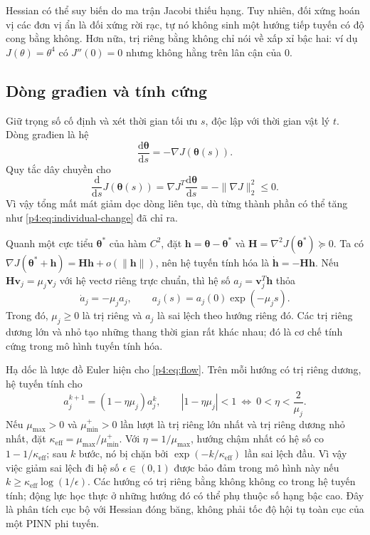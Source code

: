 Hessian có thể suy biến do ma trận Jacobi thiếu hạng. Tuy nhiên,
đối xứng hoán vị các đơn vị ẩn là đối xứng rời rạc, tự nó không sinh
một hướng tiếp tuyến có độ cong bằng không. Hơn nữa, trị riêng bằng
không chỉ nói về xấp xỉ bậc hai: ví dụ $J(\theta)=\theta^4$ có
$J''(0)=0$ nhưng không hằng trên lân cận của $0$.

\subsection{Dòng građien và tính cứng}

Giữ trọng số cố định và xét thời gian tối ưu $s$, độc lập với thời
gian vật lý $t$. Dòng građien là hệ
\begin{equation}
 \frac{\mathrm{d}\boldsymbol{\theta}}{\mathrm{d}s}
 =-\nabla J(\boldsymbol{\theta}(s)).
 \label{p4:eq:flow}
\end{equation}
Quy tắc dây chuyền cho
\begin{equation}
 \frac{\mathrm{d}}{\mathrm{d}s}J(\boldsymbol{\theta}(s))
 =\nabla J^T\frac{\mathrm{d}\boldsymbol{\theta}}{\mathrm{d}s}
 =-\|\nabla J\|_2^2\leq0.
 \label{p4:eq:flow-energy}
\end{equation}
Vì vậy tổng mất mát giảm dọc dòng liên tục, dù từng thành phần có thể
tăng như \eqref{p4:eq:individual-change} đã chỉ ra.

Quanh một cực tiểu $\boldsymbol{\theta}^{*}$ của hàm $C^2$, đặt
$\mathbf{h}=\boldsymbol{\theta}-\boldsymbol{\theta}^{*}$ và
$\mathbf{H}=\nabla^2J(\boldsymbol{\theta}^{*})\succeq0$.
Ta có $\nabla J(\boldsymbol{\theta}^{*}+\mathbf{h})
=\mathbf{H}\mathbf{h}+o(\|\mathbf{h}\|)$, nên hệ tuyến tính hóa là
$\dot{\mathbf{h}}=-\mathbf{H}\mathbf{h}$.
Nếu $\mathbf{H}\mathbf{v}_j=\mu_j\mathbf{v}_j$ với hệ vectơ riêng
trực chuẩn, thì hệ số $a_j=\mathbf{v}_j^T\mathbf{h}$ thỏa
\begin{equation}
 \dot a_j=-\mu_ja_j,
 \qquad a_j(s)=a_j(0)\exp(-\mu_js).
 \label{p4:eq:flow-modes}
\end{equation}
Trong đó, $\mu_j\geq0$ là trị riêng và $a_j$ là sai lệch theo hướng
riêng đó. Các trị riêng dương lớn và nhỏ tạo những thang thời gian
rất khác nhau; đó là cơ chế tính cứng trong mô hình tuyến tính hóa.

Hạ dốc là lược đồ Euler hiện cho \eqref{p4:eq:flow}. Trên mỗi hướng
có trị riêng dương, hệ tuyến tính cho
\begin{equation}
 a_j^{k+1}=(1-\eta\mu_j)a_j^k,
 \qquad |1-\eta\mu_j|<1
 \ \Longleftrightarrow\ 0<\eta<\frac{2}{\mu_j}.
 \label{p4:eq:euler-stability}
\end{equation}
Nếu $\mu_{\max}>0$ và $\mu_{\min}^{+}>0$ lần lượt là trị riêng lớn
nhất và trị riêng dương nhỏ nhất, đặt
$\kappa_{\mathrm{eff}}=\mu_{\max}/\mu_{\min}^{+}$.
Với $\eta=1/\mu_{\max}$, hướng chậm nhất có hệ số co
$1-1/\kappa_{\mathrm{eff}}$; sau $k$ bước, nó bị chặn bởi
$\exp(-k/\kappa_{\mathrm{eff}})$ lần sai lệch đầu. Vì vậy việc giảm
sai lệch đi hệ số $\epsilon\in(0,1)$ được bảo đảm trong mô hình này
nếu $k\geq\kappa_{\mathrm{eff}}\log(1/\epsilon)$.
Các hướng có trị riêng bằng không không co trong hệ tuyến tính;
động lực học thực ở những hướng đó có thể phụ thuộc số hạng bậc cao.
Đây là phân tích cục bộ với Hessian đóng băng, không phải tốc độ hội
tụ toàn cục của một PINN phi tuyến.

